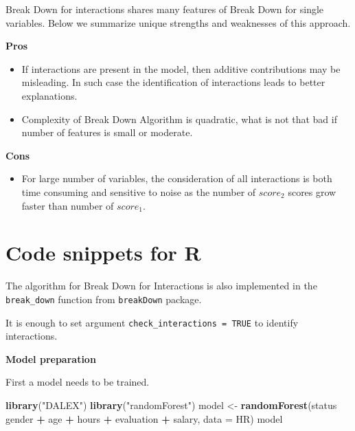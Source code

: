 \documentclass[]{book}
\newenvironment{Shaded}{\begin{snugshade}}{\end{snugshade}}
\newcommand{\DataTypeTok}[1]{\textcolor[rgb]{0.13,0.29,0.53}{#1}}
\newcommand{\KeywordTok}[1]{\textcolor[rgb]{0.13,0.29,0.53}{\textbf{#1}}}
\newcommand{\NormalTok}[1]{#1}
\newcommand{\OperatorTok}[1]{\textcolor[rgb]{0.81,0.36,0.00}{\textbf{#1}}}
\newcommand{\StringTok}[1]{\textcolor[rgb]{0.31,0.60,0.02}{#1}}
\providecommand{\tightlist}{%
  \setlength{\itemsep}{0pt}\setlength{\parskip}{0pt}}
\theoremstyle{definition}
\theoremstyle{definition}
\theoremstyle{definition}
\theoremstyle{remark}
\begin{document}
Break Down for interactions shares many features of Break Down for
single variables. Below we summarize unique strengths and weaknesses of
this approach.

\textbf{Pros}

\begin{itemize}
\tightlist
\item
  If interactions are present in the model, then additive contributions
  may be misleading. In such case the identification of interactions
  leads to better explanations.
\item
  Complexity of Break Down Algorithm is quadratic, what is not that bad
  if number of features is small or moderate.
\end{itemize}

\textbf{Cons}

\begin{itemize}
\tightlist
\item
  For large number of variables, the consideration of all interactions
  is both time consuming and sensitive to noise as the number of
  \(score_2\) scores grow faster than number of \(score_1\).
\end{itemize}

\hypertarget{code-snippets-for-r-1}{%
\section{Code snippets for R}\label{code-snippets-for-r-1}}

The algorithm for Break Down for Interactions is also implemented in the
\texttt{break\_down} function from \texttt{breakDown} package.

It is enough to set argument \texttt{check\_interactions\ =\ TRUE} to
identify interactions.

\textbf{Model preparation}

First a model needs to be trained.

\begin{Shaded}
\begin{Highlighting}[]
\KeywordTok{library}\NormalTok{(}\StringTok{"DALEX"}\NormalTok{)}
\KeywordTok{library}\NormalTok{(}\StringTok{"randomForest"}\NormalTok{)}
\NormalTok{model <-}\StringTok{ }\KeywordTok{randomForest}\NormalTok{(status }\OperatorTok{~}\StringTok{ }\NormalTok{gender }\OperatorTok{+}\StringTok{ }\NormalTok{age }\OperatorTok{+}\StringTok{ }\NormalTok{hours }\OperatorTok{+}\StringTok{ }\NormalTok{evaluation }\OperatorTok{+}\StringTok{ }\NormalTok{salary, }\DataTypeTok{data =}\NormalTok{ HR)}
\NormalTok{model}
\end{Highlighting}
\end{Shaded}
\end{document}
